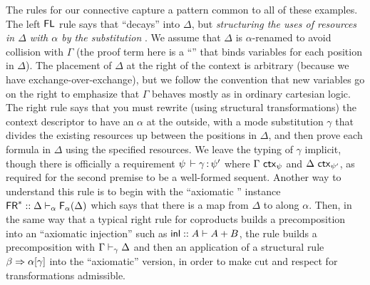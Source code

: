 The rules for our  connective capture a pattern common to all of
these examples.  The left $\mathsf{FL}$ rule says that \F{\alpha}{\Delta}
``decays'' into $\Delta$, but \emph{structuring the uses of resources in
  $\Delta$ with $\alpha$ by the substitution }.
We assume that $\Delta$ is $\alpha$-renamed to avoid collision with
$\Gamma$ (the proof term here is a ``'' that binds
variables for each position in $\Delta$).  The placement of $\Delta$ at
the right of the context is arbitrary (because we have
exchange-over-exchange), but we follow the convention that new variables
go on the right to emphasize that $\Gamma$ behaves mostly as in ordinary
cartesian logic.  The right \FR\/ rule says that you must rewrite (using
structural transformations) the context descriptor to have an $\alpha$
at the outside, with a mode substitution $\gamma$ that divides the
existing resources up between the positions in $\Delta$, and then prove
each formula in $\Delta$ using the specified resources.  We leave the
typing of $\gamma$ implicit, though there is officially a requirement
$\psi \, \vdash \gamma \, \mathit{:} \, \psi'$ where $\Gamma \,\, \mathsf{ctx}_{\psi}$ and
$\Delta \,\, \mathsf{ctx}_{\psi'}$, as required for the second premise to be a
well-formed sequent.  Another way to understand this rule is to begin
with the ``axiomatic \FR'' instance 
$\mathsf{FR}^* :: {\Delta \vdash_{\alpha} \mathsf{F}_{\alpha}(\Delta)}{}$
which says that there is a map from $\Delta$ to \F{\alpha}{\Delta} along
$\alpha$.  Then, in the same way that a typical right rule for
coproducts builds a precomposition into an ``axiomatic injection'' such
as $\mathsf{inl} :: A \vdash A + B$, the \FR\/ rule builds a precomposition
with $\Gamma \vdash_{\gamma} \Delta$ and then an application of a
structural rule $\beta \Rightarrow \alpha[\gamma]$ into the ``axiomatic''
version, in order to make cut and respect for transformations
admissible.

